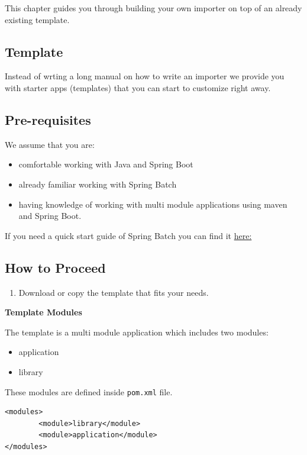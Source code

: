 This chapter guides you through building your own importer on top of an
already existing template.

\subsection{Template}\label{template}

Instead of wrting a long manual on how to write an importer we provide
you with starter apps (templates) that you can start to customize right
away.

\subsection{Pre-requisites}

We assume that you are:

\begin{itemize}
\tightlist
\item
  comfortable working with Java and Spring Boot
\item
  already familiar working with Spring Batch
\item
  having knowledge of working with multi module applications using maven
  and Spring Boot.
\end{itemize}

If you need a quick start guide of Spring Batch you can find it
\href{https://projects.spring.io/spring-batch/}{here:}

\subsection{How to Proceed}

\begin{enumerate}
\def\labelenumi{\arabic{enumi}.}
\tightlist
\item
  Download or copy the template that fits your needs.
\end{enumerate}

\textbf{Template Modules}

The template is a multi module application which includes two modules:

\begin{itemize}
\tightlist
\item
  application
\item
  library
\end{itemize}

These modules are defined inside \texttt{pom.xml} file.

\begin{verbatim}
<modules>
        <module>library</module>
        <module>application</module>
</modules>
\end{verbatim}


